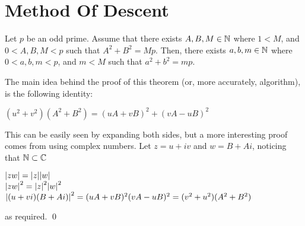 \documentclass[../main.tex]{subfiles}
\begin{document}
\section{Method Of Descent}
\begin{thm}
    Let $p$ be an odd prime. Assume that there exists $A,B,M \in \mathbb{N}$ where $1 < M$, and $0 < A,B,M < p$ such that $A^2+B^2=Mp$. Then, there exists $a,b,m \in \mathbb{N}$ where $0 < a,b,m < p$, and $m < M$ such that $a^2+b^2=mp$.
\end{thm}
The main idea behind the proof of this theorem (or, more accurately, algorithm), is the following identity:
\begin{thm}
    $(u^2+v^2)(A^2+B^2)=(uA+vB)^2+(vA-uB)^2$
\end{thm}
\begin{pf}
    This can be easily seen by expanding both sides, but a more interesting proof comes from using complex numbers. Let $z=u+iv$ and $w=B+Ai$, noticing that $\mathbb{N} \subset \mathbb{C}$
    \begin{center}
        $\abs{zw}=\abs{z}\abs{w}$ \\
        $\abs{zw}^2=\abs{z}^2\abs{w}^2$ \\
        $\abs{(u+vi)(B+Ai)}^2=(uA+vB)^2(vA-uB)^2=(v^2+u^2)(A^2+B^2)$
    \end{center}
    as required. \qed
\end{pf}
\end{document}
